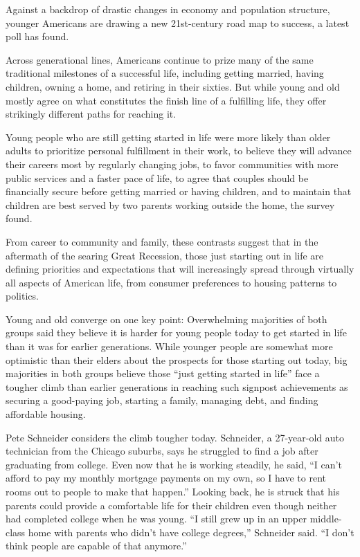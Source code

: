 Against a backdrop of drastic changes in economy and population structure, younger Americans are drawing a new 21st-century road map to success, a latest poll has found.


Across generational lines, Americans continue to prize many of the same traditional milestones of a successful life, including getting married, having children, owning a home, and retiring in their sixties. But while young and old mostly agree on what constitutes the finish line of a fulfilling life, they offer strikingly different paths for reaching it.


Young people who are still getting started in life were more likely than older adults to prioritize personal fulfillment in their work, to believe they will advance their careers most by regularly changing jobs, to favor communities with more public services and a faster pace of life, to agree that couples should be financially secure before getting married or having children, and to maintain that children are best served by two parents working outside the home, the survey found.


From career to community and family, these contrasts suggest that in the aftermath of the searing Great Recession, those just starting out in life are defining priorities and expectations that will increasingly spread through virtually all aspects of American life, from consumer preferences to housing patterns to politics.


Young and old converge on one key point: Overwhelming majorities of both groups said they believe it is harder for young people today to get started in life than it was for earlier generations. While younger people are somewhat more optimistic than their elders about the prospects for those starting out today, big majorities in both groups believe those ``just getting started in life'' face a tougher climb than earlier generations in reaching such signpost achievements as securing  a good-paying job, starting a family, managing debt, and finding affordable housing.


Pete Schneider considers the climb tougher today. Schneider, a 27-year-old auto technician from the Chicago suburbs, says he struggled to find a job after graduating from college. Even now that he is working steadily, he said, ``I can't afford to pay my monthly mortgage payments on my own, so I have to rent rooms out to people to make that happen.'' Looking back, he is struck that his parents could provide a comfortable life for their children even though neither had completed college when he was young. ``I still grew up in an upper middle-class home with parents who didn't have college degrees,'' Schneider said. ``I don't think people are capable of that anymore.''